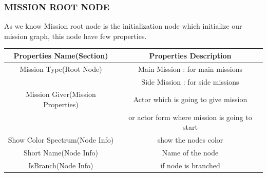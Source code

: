 \documentclass[12pt]{article}
\begin{document}
	  \subsubsection{MISSION ROOT NODE}
	  As we know Mission root node is the initialization node which initialize our mission graph, this node have few properties.\\
	  \begin{center}
	 	 \begin{tabular}{|c|c|}\hline
			Properties Name(Section) & Properties Description\\					\hline\hline
			Mission Type(Root Node) & Main Mission : for main 					missions\\& Side Mission : for side missions\\\hline
			Mission Giver(Mission Properties) & Actor which is 					going to give mission \\ & or actor form where 						mission is going to start\\\hline
			Show Color Spectrum(Node Info) & show the nodes 					color\\\hline
			Short Name(Node Info) & Name of the node\\\hline
			IsBranch(Node Info) & if node is branched\\\hline
			
			
		\end{tabular}
	  \end{center}
	\pagebreak
\end{document}
